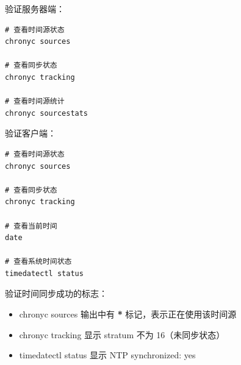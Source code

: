 \documentclass[12pt,UTF8]{ctexbook}
\begin{document}
验证服务器端：
\begin{verbatim}
# 查看时间源状态
chronyc sources

# 查看同步状态
chronyc tracking

# 查看时间源统计
chronyc sourcestats
\end{verbatim}

验证客户端：
\begin{verbatim}
# 查看时间源状态
chronyc sources

# 查看同步状态
chronyc tracking

# 查看当前时间
date

# 查看系统时间状态
timedatectl status
\end{verbatim}

验证时间同步成功的标志：
\begin{itemize}
    \item chronyc sources 输出中有 \textbf{*} 标记，表示正在使用该时间源
    \item chronyc tracking 显示 stratum 不为 16（未同步状态）
    \item timedatectl status 显示 NTP synchronized: yes
\end{itemize}

\backmatter
\end{document}
